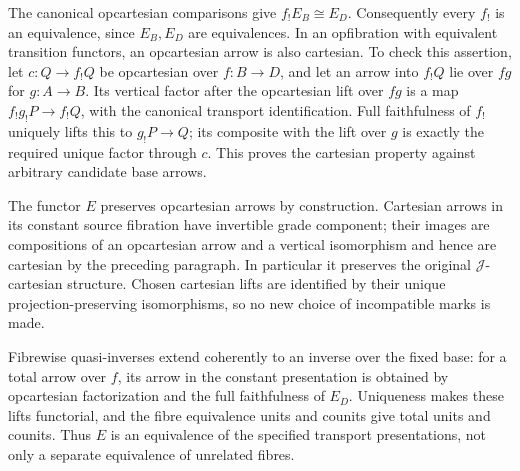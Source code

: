 \documentclass[11pt,a4paper]{article}
\theoremstyle{definition}
\newcommand{\J}{\mathcal J}
\begin{document}
The canonical opcartesian comparisons give $f_!E_B\cong E_D$. Consequently
every $f_!$ is an equivalence, since $E_B,E_D$ are equivalences. In an
opfibration with equivalent transition functors, an opcartesian arrow is
also cartesian. To check this assertion, let $c:Q\to f_!Q$ be opcartesian
over $f:B\to D$, and let an arrow into $f_!Q$ lie over $fg$ for
$g:A\to B$. Its vertical factor after the opcartesian lift over $fg$ is a
map $f_!g_!P\to f_!Q$, with the canonical transport identification.
Full faithfulness of $f_!$ uniquely lifts this to $g_!P\to Q$; its composite
with the lift over $g$ is exactly the required unique factor through $c$.
This proves the cartesian property against arbitrary candidate base arrows.

The functor $E$ preserves opcartesian arrows by construction. Cartesian
arrows in its constant source fibration have invertible grade component;
their images are compositions of an opcartesian arrow and a vertical
isomorphism and hence are cartesian by the preceding paragraph. In
particular it preserves the original $\J$-cartesian structure. Chosen
cartesian lifts are identified by their unique projection-preserving
isomorphisms, so no new choice of incompatible marks is made.

Fibrewise quasi-inverses extend coherently to an inverse over the fixed base:
for a total arrow over $f$, its arrow in the constant presentation is
obtained by opcartesian factorization and the full faithfulness of $E_D$.
Uniqueness makes these lifts functorial, and the fibre equivalence units and
counits give total units and counits. Thus $E$ is an equivalence of the
specified transport presentations, not only a separate equivalence of
unrelated fibres.
\end{document}
